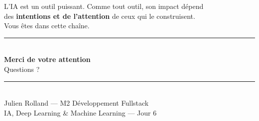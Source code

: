 \documentclass[aspectratio=169, 10pt]{beamer}
\begin{document}
\begin{frame}[plain]
  \begin{center}
    \vspace{0.8cm}
    {\large L'IA est un outil puissant.
    Comme tout outil, son impact dépend\\
    des \textbf{intentions et de l'attention}
    de ceux qui le construisent.\\[0.3cm]
    Vous êtes dans cette chaîne.}\\[1cm]
    \textcolor{jedy_mid}{\rule{8cm}{0.4pt}}\\[0.8cm]
    {\Large\bfseries Merci de votre attention}\\[0.6cm]
    {\large Questions ?}\\[0.8cm]
    \textcolor{jedy_mid}{\rule{6cm}{0.4pt}}\\[0.4cm]
    {\small Julien Rolland — M2 Développement Fullstack}\\[0.2cm]
    {\small IA, Deep Learning \& Machine Learning — Jour 6}
  \end{center}
\end{frame}
\end{document}
